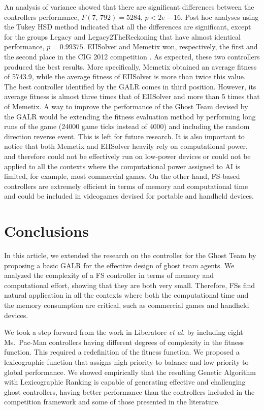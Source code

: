 \documentclass[journal]{IEEEtran}
\begin{document}
An analysis of variance showed that there are significant differences between the controllers performance, $F(7,\, 792) = 5284$, $p <2e-16$. Post hoc analyses using the Tukey HSD method indicated that all the differences are significant, except for the groups Legacy and Legacy2TheReckoning that have almost identical performance, $p = 0.99375$.
EIISolver and Memetix won, respectively, the first and the second place in the CIG 2012 competition \cite{CompetitionURL}. As expected, these two controllers produced the best results. More specifically, Memetix obtained an average fitness of 5743.9, while the average fitness of EIISolver is more than twice this value.
The best controller identified by the GALR comes in third position. However, its average fitness is almost three times that of EIISolver and more than 5 times that of Memetix. A way to improve the performance of the Ghost Team devised by the GALR would be extending the fitness evaluation method by performing long runs of the game (24000 game ticks instead of 4000) and including the random direction reverse event. This is left for future research. It is also important to notice that both Memetix and EIISolver heavily rely on computational power, and therefore could not be effectively run on low-power devices or could not be applied to all the contexts where the computational power assigned to AI is limited, for example, most commercial games. On the other hand, FS-based controllers are extremely efficient in terms of memory and computational time and could be included in videogames devised for portable and handheld devices.

\section{Conclusions}
\label{sec:Conclusions}
In this article, we extended the research on the controller for the
Ghost Team by proposing a basic GALR for the effective design of ghost team agents. We analyzed the complexity of a FS controller in terms of memory and computational effort, showing that they are both very small. Therefore, FSs find natural application in all the contexts where both the computational time and the memory consumption are critical, such as commercial games and handheld devices.

We took a step forward from the work in Liberatore \emph{et al.} \cite{Liberatore2014} by including eight Ms.\  Pac-Man controllers having different degrees of complexity in the fitness function. This required a redefinition of the fitness function. We proposed a lexicographic function that assigns high priority to balance and low priority to global performance. We showed empirically that the resulting Genetic Algorithm with Lexicographic Ranking is capable of generating effective and challenging ghost controllers, having better performance than the controllers included in the competition framework and some of those presented in the literature.
\end{document}
